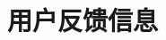\documentclass[a4paper, twoside, utf8]{ctexart}
\begin{document}
\begin{center}
\begin{longtable}
        \end{longtable}
        \vspace{-3em}
    \end{center}

    \section{用户反馈信息}

	
\end{document}
